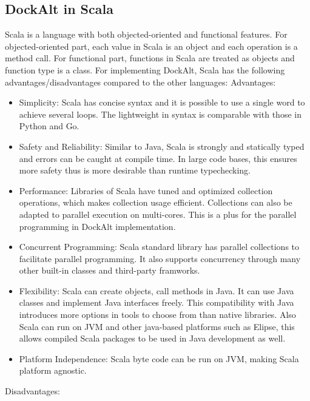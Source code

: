 \documentclass[letterpaper,twocolumn,10pt]{article}
\begin{document}
\subsection{DockAlt in Scala}
Scala is a language with both objected-oriented and functional features. For objected-oriented part, each value in Scala is an object and each operation is a method call. For functional part, functions in Scala are treated as objects and function type is a class. For implementing DockAlt, Scala has the following advantages/disadvantages compared to the other languages:\newline
Advantages:
\begin{itemize}
\item Simplicity: Scala has concise syntax and it is possible to use a single word to achieve several loops. The lightweight in syntax is comparable with those in Python and Go.
\item Safety and Reliability: Similar to Java, Scala is strongly and statically typed and errors can be caught at compile time. In large code bases, this ensures more safety thus is more desirable than runtime typechecking.
\item Performance: Libraries of Scala have tuned and optimized collection operations, which makes collection usage efficient. Collections can also be adapted to parallel execution on multi-cores. This is a plus for the parallel programming in DockAlt implementation.
\item Concurrent Programming: Scala standard library has parallel collections to facilitate parallel programming. It also supports concurrency through many other built-in classes and third-party framworks. 
\item Flexibility: Scala can create objects, call methods in Java. It can use Java classes and implement Java interfaces freely. This compatibility with Java introduces more options in tools to choose from than native libraries. Also Scala can run on JVM and other java-based platforms such as Elipse, this allows compiled Scala packages to be used in Java development as well. 
\item Platform Independence: Scala byte code can be run on JVM, making Scala platform agnostic.

\end{itemize}
Disadvantages:
\end{document}
